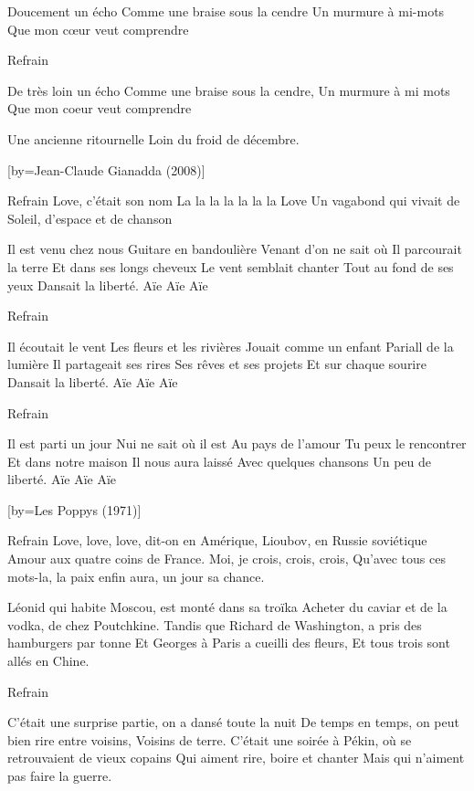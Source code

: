 \beginverse
Doucement un écho
Comme une braise sous la cendre
Un murmure à mi-mots
Que mon cœur veut comprendre
\endverse

\beginverse
Refrain
\endverse

\beginverse
De très loin un écho
Comme une braise sous la cendre,
Un murmure à mi mots
Que mon coeur veut comprendre
\endverse

\beginverse
Une ancienne ritournelle
Loin du froid de décembre.
\endverse

[by={Jean-Claude Gianadda (2008)}]

\beginverse
Refrain
Love, c'était son nom
La la la la la la la Love
Un vagabond qui vivait de
Soleil, d'espace et de chanson
\endverse

\beginverse
Il est venu chez nous
Guitare en bandoulière
Venant d'on ne sait où
Il parcourait la terre
Et dans ses longs cheveux
Le vent semblait chanter
Tout au fond de ses yeux
Dansait la liberté. Aïe Aïe Aïe
\endverse

\beginverse
Refrain
\endverse

\beginverse
Il écoutait le vent
Les fleurs et les rivières
Jouait comme un enfant
Pariall de la lumière
Il partageait ses rires
Ses rêves et ses projets
Et sur chaque sourire
Dansait la liberté. Aïe Aïe Aïe
\endverse

\beginverse
Refrain
\endverse

\beginverse
Il est parti un jour
Nui ne sait où il est
Au pays de l'amour
Tu peux le rencontrer
Et dans notre maison
Il nous aura laissé
Avec quelques chansons
Un peu de liberté. Aïe Aïe Aïe
\endverse

[by={Les Poppys (1971)}]

\beginverse
Refrain
Love, love, love, dit-on en Amérique, Lioubov, en Russie soviétique
Amour aux quatre coins de France. Moi, je crois, crois, crois, 
Qu'avec tous ces mots-la, la paix enfin aura, un jour sa chance.
\endverse

\beginverse
Léonid qui habite Moscou, est monté dans sa troïka
Acheter du caviar et de la vodka, de chez Poutchkine.
Tandis que Richard de Washington, a pris des hamburgers par tonne
Et Georges à Paris a cueilli des fleurs, 
Et tous trois sont allés en Chine.
\endverse

\beginverse
Refrain
\endverse

\beginverse
C'était une surprise partie, on a dansé toute la nuit
De temps en temps, on peut bien rire entre voisins,
Voisins de terre.
C'était une soirée à Pékin, où se retrouvaient de vieux copains
Qui aiment rire, boire et chanter
Mais qui n'aiment pas faire la guerre.
\endverse

